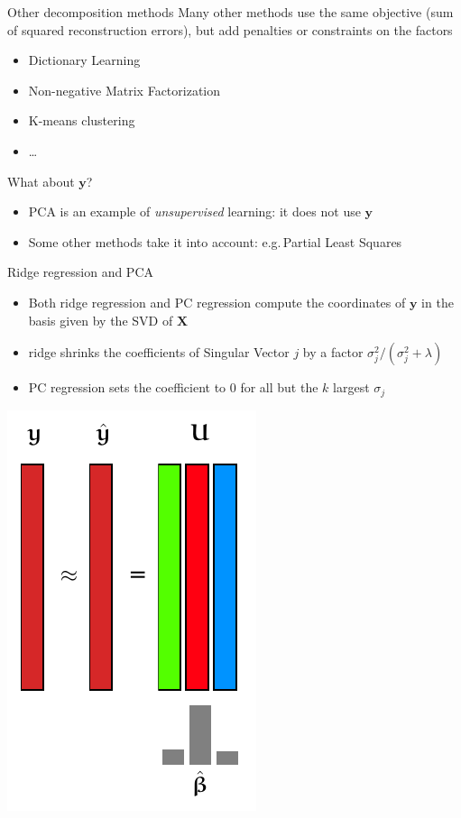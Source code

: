 \documentclass[presentation,mathserif,table]{beamer}
\newcommand{\eg}{e.g.\,}
\newcommand{\X}{{\mathbold X}}
\newcommand{\y}{{\mathbold y}}
\begin{document}
\begin{frame}[label={sec:org3b1b629}]{Other decomposition methods}
Many other methods use the same objective (sum of squared reconstruction errors), but add penalties or constraints on the factors
\begin{itemize}
\item Dictionary Learning
\item Non-negative Matrix Factorization
\item K-means clustering
\item \ldots{}
\end{itemize}

\begin{block}{What about \(\y\)?}
\begin{itemize}
\item PCA is an example of \emph{unsupervised} learning: it does not use \(\y\)
\item Some other methods take it into account: \eg Partial Least Squares
\end{itemize}
\end{block}
\end{frame}
\begin{frame}[label={sec:org20a9ca6}]{Ridge regression and PCA}
\begin{itemize}
\item Both ridge regression and PC regression compute the coordinates of \(\y\) in the basis given by the SVD of \(\X\)
\item ridge shrinks the coefficients of Singular Vector \(j\) by a factor \(\sigma_j^2 / (\sigma_j^2 + \lambda)\)
\item PC regression sets the coefficient to 0 for all but the \(k\) largest \(\sigma_j\)
\end{itemize}

\begin{center}
\includegraphics[height=.6\textheight]{figures/generated/dim_reduction_colors/regression_reduced_3_svd.pdf}
\end{center}
\end{frame}
\end{document}
